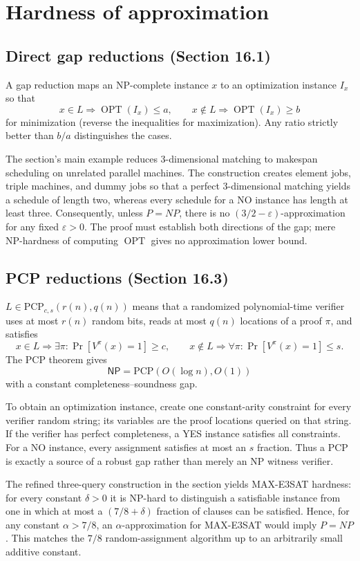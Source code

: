 \documentclass[11pt,a4paper]{article}
\newcommand{\OPT}{\operatorname{OPT}}
\newcommand{\1}{\mathbf 1}
\begin{document}
\section{Hardness of approximation}

\subsection{Direct gap reductions (Section 16.1)}

A gap reduction maps an NP-complete instance $x$ to an optimization instance $I_x$ so
that
\[
 x\in L\Rightarrow\OPT(I_x)\leq a,\qquad
 x\notin L\Rightarrow\OPT(I_x)\geq b
\]
for minimization (reverse the inequalities for maximization).  Any ratio strictly
better than $b/a$ distinguishes the cases.

The section's main example reduces 3-dimensional matching to makespan scheduling on
unrelated parallel machines.  The construction creates element jobs, triple machines,
and dummy jobs so that a perfect 3-dimensional matching yields a schedule of length
two, whereas every schedule for a NO instance has length at least three.  Consequently,
unless $P=NP$, there is no $(3/2-\varepsilon)$-approximation for any fixed
$\varepsilon>0$.  The proof must establish both directions of the gap; mere
NP-hardness of computing $\OPT$ gives no approximation lower bound.

\subsection{PCP reductions (Section 16.3)}

$L\in\mathrm{PCP}_{c,s}(r(n),q(n))$ means that a randomized polynomial-time verifier
uses at most $r(n)$ random bits, reads at most $q(n)$ locations of a proof $\pi$, and
satisfies
\[
 x\in L\Rightarrow\exists\pi:\Pr[V^\pi(x)=1]\geq c,\qquad
 x\notin L\Rightarrow\forall\pi:\Pr[V^\pi(x)=1]\leq s.
\]
The PCP theorem gives
\[
  \mathsf{NP}=\mathrm{PCP}(O(\log n),O(1))
\]
with a constant completeness--soundness gap.

To obtain an optimization instance, create one constant-arity constraint for every
verifier random string; its variables are the proof locations queried on that string.
If the verifier has perfect completeness, a YES instance satisfies all constraints.
For a NO instance, every assignment satisfies at most an $s$ fraction.  Thus a PCP is
exactly a source of a robust gap rather than merely an NP witness verifier.

The refined three-query construction in the section yields MAX-E3SAT hardness:
for every constant $\delta>0$ it is NP-hard to distinguish a satisfiable instance from
one in which at most a $(7/8+\delta)$ fraction of clauses can be satisfied.  Hence, for
any constant $\alpha>7/8$, an $\alpha$-approximation for MAX-E3SAT would imply
$P=NP$.  This matches the $7/8$ random-assignment algorithm up to an arbitrarily small
additive constant.
\end{document}
